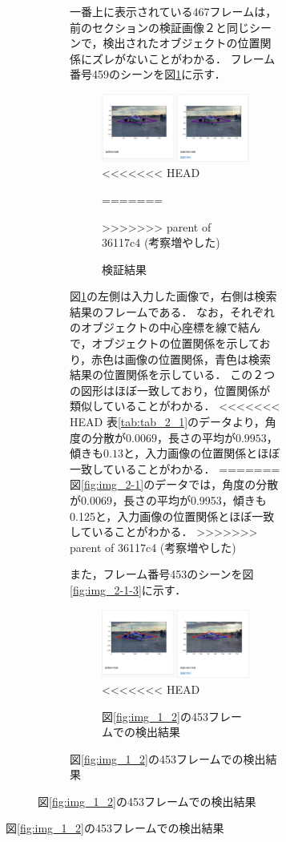 \documentclass[a4j,12pt,dvipdfmx]{jreport}
\begin{document}
\begin{figure}[H]
\begin{figure}[H]
\begin{figure}[H]
一番上に表示されている467フレームは，前のセクションの検証画像２と同じシーンで，検出されたオブジェクトの位置関係にズレがないことがわかる．
フレーム番号459のシーンを図\ref{fig:img_2-1-2}に示す．

\begin{figure}[H]
  \centering
  \includegraphics[width=13cm]{image/result_2_1_2.jpg}
<<<<<<< HEAD
  \caption{図\ref{fig:img_1_2}の459フレームでの検出結果}
  \label{fig:img_2_1_2}
=======
  \caption{検証結果}
  \label{fig:img_2-1-2}
>>>>>>> parent of 36117c4 (考察増やした)
\end{figure}

図\ref{fig:img_2-1-2}の左側は入力した画像で，右側は検索結果のフレームである．
なお，それぞれのオブジェクトの中心座標を線で結んで，オブジェクトの位置関係を示しており，赤色は画像の位置関係，青色は検索結果の位置関係を示している．
この２つの図形はほぼ一致しており，位置関係が類似していることがわかる．
<<<<<<< HEAD
表\ref{tab:tab_2_1}のデータより，角度の分散が$0.0069$，長さの平均が$0.9953$，傾きも$0.13$と，入力画像の位置関係とほぼ一致していることがわかる．
=======
図\ref{fig:img_2-1}のデータでは，角度の分散が0.0069，長さの平均が0.9953，傾きも0.125と，入力画像の位置関係とほぼ一致していることがわかる．
>>>>>>> parent of 36117c4 (考察増やした)

また，フレーム番号453のシーンを図\ref{fig:img_2-1-3}に示す．

\begin{figure}[H]
  \centering
  \includegraphics[width=13cm]{image/result_2_1_3.jpg}
<<<<<<< HEAD
  \caption{図\ref{fig:img_1_2}の453フレームでの検出結果}
  \label{fig:img_2_1_3}
\end{figure}


\end{figure}
\end{figure}
\end{figure}
\end{document}
